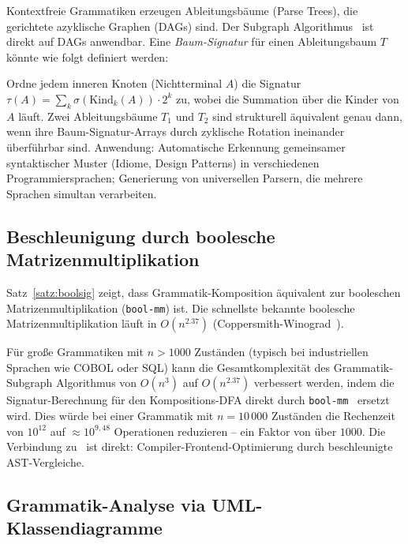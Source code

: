 ﻿\documentclass[a4paper,12pt]{article}
\theoremstyle{definition}
\begin{document}
Kontextfreie Grammatiken erzeugen Ableitungsb\"aume (Parse Trees), die
gerichtete azyklische Graphen (DAGs) sind. Der Subgraph Algorithmus~\cite{epp2026subgraph}
ist direkt auf DAGs anwendbar. Eine \emph{Baum-Signatur} f\"ur einen Ableitungsbaum
$T$ k\"onnte wie folgt definiert werden:

Ordne jedem inneren Knoten (Nichtterminal $A$) die Signatur
$\tau(A) = \sum_{k} \sigma(\mathrm{Kind}_k(A)) \cdot 2^k$ zu,
wobei die Summation \"uber die Kinder von $A$ l\"auft.
Zwei Ableitungsb\"aume $T_1$ und $T_2$ sind strukturell \"aquivalent
genau dann, wenn ihre Baum-Signatur-Arrays durch zyklische Rotation
ineinander \"uberf\"uhrbar sind.
Anwendung: Automatische Erkennung gemeinsamer syntaktischer Muster
(Idiome, Design Patterns) in verschiedenen Programmiersprachen;
Generierung von universellen Parsern, die mehrere Sprachen simultan verarbeiten.

\subsection{Beschleunigung durch boolesche Matrizenmultiplikation}

Satz~\ref{satz:boolsig} zeigt, dass Grammatik-Komposition \"aquivalent zur
booleschen Matrizenmultiplikation (\texttt{bool-mm}) ist. Die schnellste bekannte
boolesche Matrizenmultiplikation l\"auft in $O(n^{2.37})$
(Coppersmith-Winograd~\cite{coppersmith1987}).

F\"ur gro{\ss}e Grammatiken mit $n > 1000$ Zust\"anden (typisch bei
industriellen Sprachen wie COBOL oder SQL) kann die Gesamtkomplexit\"at des
Grammatik-Subgraph Algorithmus von $O(n^3)$ auf $O(n^{2.37})$ verbessert werden,
indem die Signatur-Berechnung f\"ur den Kompositions-DFA direkt durch
\texttt{bool-mm}~\cite{epp2026boolmm} ersetzt wird.
Dies w\"urde bei einer Grammatik mit $n = 10\,000$ Zust\"anden die Rechenzeit
von $10^{12}$ auf $\approx 10^{9{,}48}$ Operationen reduzieren -- ein Faktor
von \"uber $1000$. Die Verbindung zu~\cite{epp2026ccl} ist direkt:
Compiler-Frontend-Optimierung durch beschleunigte AST-Vergleiche.

\subsection{Grammatik-Analyse via UML-Klassendiagramme}
\end{document}
